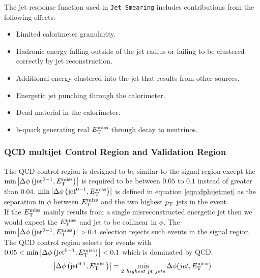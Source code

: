 \indent The jet response function used in {\tt Jet Smearing} includes contributions from the following effects: \\

\begin{itemize}
\item Limited calorimeter granularity.
\item Hadronic energy falling outside of the jet radius or failing to be clustered correctly by jet reconstruction.
\item Additional energy clustered into the jet that results from other sources.
\item Energetic jet punching through the calorimeter.
\item Dead material in the calorimeter.
\item b-quark generating real $E_{\mathrm{T}}^{\mathrm{miss}}$ through decay to neutrinos.  
\end{itemize}

\subsubsection{QCD multijet Control Region and Validation Region}
\label{sec:QCD:CR}

\indent The QCD control region is designed to be similar to the signal region except the $\min \left|\Delta\phi\left(\mathrm{jet}^{0-1},E_{\mathrm{T}}^{\mathrm{miss}}\right)\right|$ is required to be between $0.05$ to $0.1$ instead of greater than $0.04$.  $\min \left|\Delta\phi\left(\mathrm{jet}^{0-1},E_{\mathrm{T}}^{\mathrm{miss}}\right)\right|$ is defined in equation \ref{eqn:dphijetmet} as the separation in $\phi$  between $E_{\mathrm{T}}^{\mathrm{miss}}$ and the two highest $p_{\mathrm{T}}$ jets in the event.  \\

\indent If the $E_{\mathrm{T}}^{\mathrm{miss}}$ mainly results from a single misreconstructed energetic jet then we would expect the $E_{\mathrm{T}}^{\mathrm{miss}}$ and jet to be collinear in $\phi$.  The $\min \left|\Delta\phi\left(\mathrm{jet}^{0-1},E_{\mathrm{T}}^{\mathrm{miss}}\right)\right| > 0.4$ selection rejects such events in the signal region.  The QCD control region selects for events with $0.05 < \min \left|\Delta\phi\left(\mathrm{jet}^{0-1},E_{\mathrm{T}}^{\mathrm{miss}}\right)\right| < 0.1$ which is dominated by QCD.  \\

\begin{equation}
\left|\Delta\phi\left(\mathrm{jet}^{0,1},E_{\mathrm{T}}^{\mathrm{miss}}\right)\right| = \min_{2~highest~pt~jets} \Delta \phi ( jet, E_{\mathrm{T}}^{\mathrm{miss}} ) 
\label{eqn:dphijetmet}
\end{equation}


